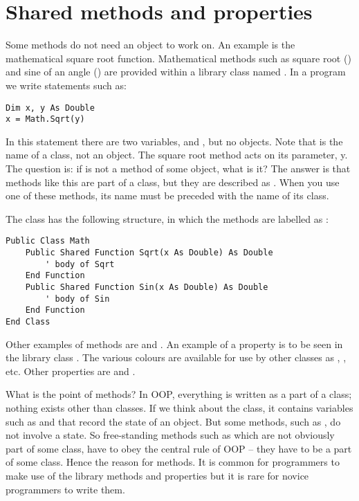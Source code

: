 	\section{Shared methods and properties}
	Some methods do not need an object to work on. An example is the mathematical square root function. Mathematical methods such as square root () and sine of an angle () are provided within a library class named . In a program we write statements such as:
		\begin{lstlisting}
Dim x, y As Double
x = Math.Sqrt(y)
		\end{lstlisting}
		In this statement there are two  variables,  and , but no objects. Note that  is the name of a class, not an object. The square root method  acts on its parameter, y. The question is: if  is not a method of some object, what is it? The answer is that methods like this are part of a class, but they are described as . When you use one of these methods, its name must be preceded with the name of its class.
		
		The class  has the following structure, in which the methods are labelled as :
		\begin{lstlisting}
Public Class Math
	Public Shared Function Sqrt(x As Double) As Double
		' body of Sqrt
	End Function
	Public Shared Function Sin(x As Double) As Double
		' body of Sin
	End Function
End Class
		\end{lstlisting}
		Other examples of  methods are  and . An example of a  property is to be seen in the library class . The various colours are available for use by other classes as , , etc. Other  properties are  and .
		
		What is the point of  methods? In OOP, everything is written as a part of a class; nothing exists other than classes. If we think about the  class, it contains  variables such as  and that record the state of an object. But some methods, such as , do not involve a state. So free-standing methods such as  which are not obviously part of some class, have to obey the central rule of OOP – they have to be a part of some class. Hence the reason for  methods. It is common for programmers to make use of the library  methods and properties but it is rare for novice programmers to write them.
		
